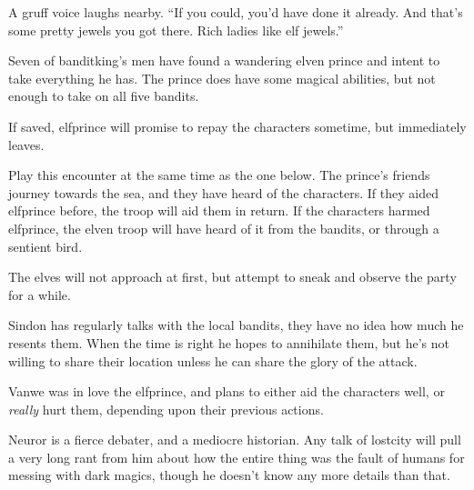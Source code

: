 \begin{multicols}{2}
\begin{boxtext}
	A gruff voice laughs nearby.  ``If you could, you'd have done it already.  And that's some pretty jewels you got there.  Rich ladies like elf jewels.''

\end{boxtext}

Seven of \gls{banditking}'s men have found a wandering elven prince and intent to take everything he has.  The prince does have some magical abilities, but not enough to take on all five bandits.


\humansoldier


\elf

If saved, \gls{elfprince} will promise to repay the characters sometime, but immediately leaves.


Play this encounter at the same time as the one below.  The prince's friends journey towards the sea, and they have heard of the characters.  If they aided \gls{elfprince} before, the troop will aid them in return.  If the characters harmed \gls{elfprince}, the elven troop will have heard of it from the bandits, or through a sentient bird.

The elves will not approach at first, but attempt to sneak and observe the party for a while.


\elf

Sindon has regularly talks with the local bandits, they have no idea how much he resents them.
When the time is right he hopes to annihilate them, but he's not willing to share their location unless he can share the glory of the attack.

\elf

Vanwe was in love the \gls{elfprince}, and plans to either aid the characters well, or \emph{really} hurt them, depending upon their previous actions.


\label{neuror}

Neuror is a fierce debater, and a mediocre historian.  Any talk of \gls{lostcity} will pull a very long rant from him about how the entire thing was the fault of humans for messing with dark magics, though he doesn't know any more details than that.

\elf

\end{multicols}

